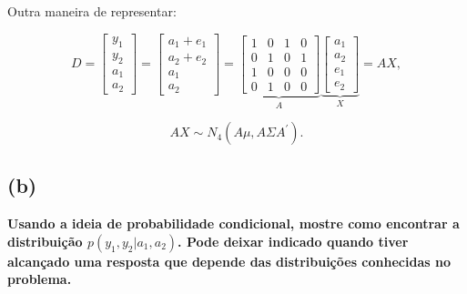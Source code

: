 \documentclass[12pt, oldfontcommands]{article}\usepackage[]{graphicx}\usepackage[]{color}
\begin{document}
Outra maneira de representar:

\[ D = \begin{bmatrix}
        y_{1} \\
        y_{2} \\
        a_{1} \\
        a_{2}
       \end{bmatrix} = \begin{bmatrix}
                        a_{1} + e_{1} \\
                        a_{2} + e_{2} \\
                        a_{1} \\
                        a_{2}
                       \end{bmatrix} = \underset{A}{\underbrace{
                                        \begin{bmatrix}
                                         1 & 0 & 1 & 0 \\
                                         0 & 1 & 0 & 1 \\
                                         1 & 0 & 0 & 0 \\
                                         0 & 1 & 0 & 0
                                        \end{bmatrix}
                                       }} \underset{X}{\underbrace{
                                           \begin{bmatrix}
                                            a_{1} \\
                                            a_{2} \\
                                            e_{1} \\
                                            e_{2}
                                           \end{bmatrix}
                                          }} = A X, \]

\[ A X \sim N_{4} ( A \mu, A \Sigma A^{'}). \]

\subsection*{(b)} 

\textbf{Usando a ideia de probabilidade condicional, mostre como encontrar
        a distribuição \(p(y_{1}, y_{2} | a_{1}, a_{2})\). Pode deixar
        indicado quando tiver alcançado uma resposta que depende das
        distribuições conhecidas no problema.}
\end{document}
